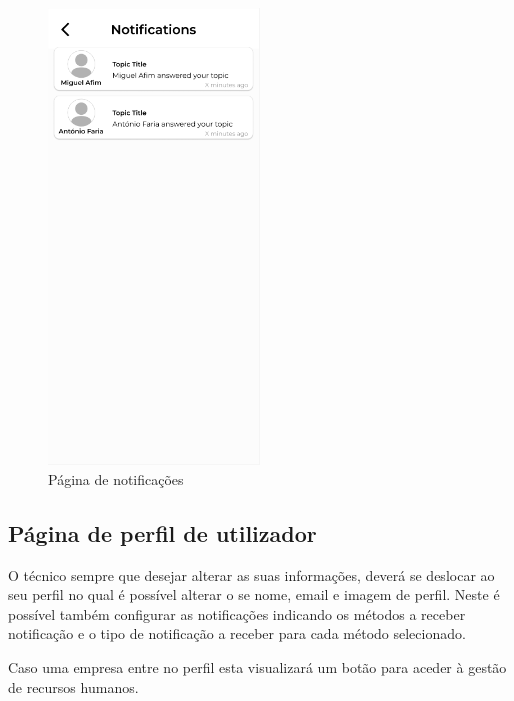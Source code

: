 \begin{figure}[htb]
    \centering
    \includegraphics[width=0.5\textwidth]{images/mockups/notifications.png}
    \caption{Página de notificações}
    \label{fig:22}
\end{figure}

\newpage

\subsection{Página de perfil de utilizador}

O técnico sempre que desejar alterar as suas informações, deverá se deslocar ao seu perfil no qual é possível
alterar o se nome, email e imagem de perfil. Neste é possível também configurar as notificações indicando os métodos
a receber notificação e o tipo de notificação a receber para cada método selecionado.

Caso uma empresa entre no perfil esta visualizará um botão para aceder à gestão de recursos humanos.

